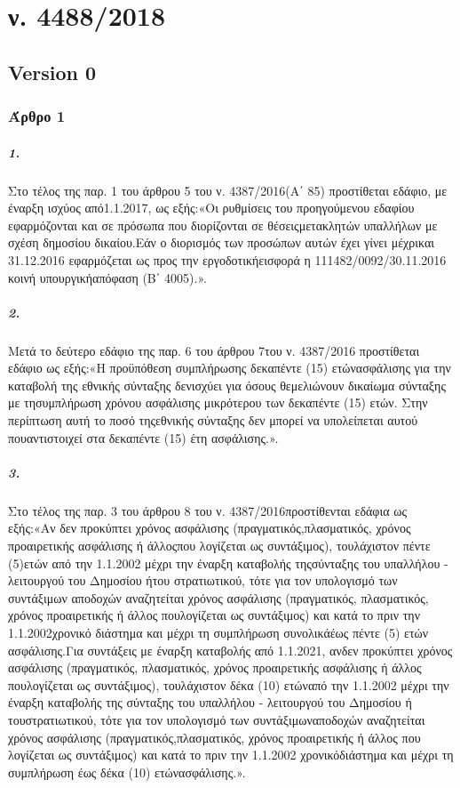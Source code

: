 \documentclass[a4paper,oneside, 10pt]{book}
\begin{document}
\chapter*{ ν. 4488/2018 }\section* { Version  0 } 
\subsection*{ Άρθρο 1 }
\paragraph { 1. } Στο τέλος της παρ. 1 του άρθρου 5 του ν. 4387/2016(Α΄ 85) προστίθεται εδάφιο, με έναρξη ισχύος από1.1.2017, ως εξής:«Οι ρυθμίσεις του προηγούμενου εδαφίου εφαρμόζονται και σε πρόσωπα που διορίζονται σε θέσειςμετακλητών υπαλλήλων με σχέση δημοσίου δικαίου.Εάν ο διορισμός των προσώπων αυτών έχει γίνει μέχρικαι 31.12.2016 εφαρμόζεται ως προς την εργοδοτικήεισφορά η 111482/0092/30.11.2016 κοινή υπουργικήαπόφαση (Β΄ 4005).».
\paragraph { 2. } Μετά το δεύτερο εδάφιο της παρ. 6 του άρθρου 7του ν. 4387/2016 προστίθεται εδάφιο ως εξής:«Η προϋπόθεση συμπλήρωσης δεκαπέντε (15) ετώνασφάλισης για την καταβολή της εθνικής σύνταξης δενισχύει για όσους θεμελιώνουν δικαίωμα σύνταξης με τησυμπλήρωση χρόνου ασφάλισης μικρότερου των δεκαπέντε (15) ετών. Στην περίπτωση αυτή το ποσό τηςεθνικής σύνταξης δεν μπορεί να υπολείπεται αυτού πουαντιστοιχεί στα δεκαπέντε (15) έτη ασφάλισης.».
\paragraph { 3. } Στο τέλος της παρ. 3 του άρθρου 8 του ν. 4387/2016προστίθενται εδάφια ως εξής:«Αν δεν προκύπτει χρόνος ασφάλισης (πραγματικός,πλασματικός, χρόνος προαιρετικής ασφάλισης ή άλλοςπου λογίζεται ως συντάξιμος), τουλάχιστον πέντε (5)ετών από την 1.1.2002 μέχρι την έναρξη καταβολής τηςσύνταξης του υπαλλήλου - λειτουργού του Δημοσίου ήτου στρατιωτικού, τότε για τον υπολογισμό των συντάξιμων αποδοχών αναζητείται χρόνος ασφάλισης (πραγματικός, πλασματικός, χρόνος προαιρετικής ή άλλος πουλογίζεται ως συντάξιμος) και κατά το πριν την 1.1.2002χρονικό διάστημα και μέχρι τη συμπλήρωση συνολικάέως πέντε (5) ετών ασφάλισης.Για συντάξεις με έναρξη καταβολής από 1.1.2021, ανδεν προκύπτει χρόνος ασφάλισης (πραγματικός, πλασματικός, χρόνος προαιρετικής ασφάλισης ή άλλος πουλογίζεται ως συντάξιμος), τουλάχιστον δέκα (10) ετώναπό την 1.1.2002 μέχρι την έναρξη καταβολής της σύνταξης του υπαλλήλου - λειτουργού του Δημοσίου ή τουστρατιωτικού, τότε για τον υπολογισμό των συντάξιμωναποδοχών αναζητείται χρόνος ασφάλισης (πραγματικός,πλασματικός, χρόνος προαιρετικής ή άλλος που λογίζεται ως συντάξιμος) και κατά το πριν την 1.1.2002 χρονικόδιάστημα και μέχρι τη συμπλήρωση έως δέκα (10) ετώνασφάλισης.».
\end{document}
